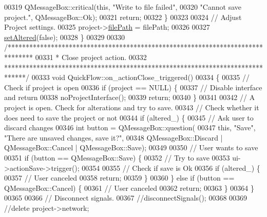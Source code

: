 \begin{DoxyCode}
00319     QMessageBox::critical(\textcolor{keyword}{this}, \textcolor{stringliteral}{"Write to file failed"},
00320                           \textcolor{stringliteral}{"Cannot save project."}, QMessageBox::Ok);
00321     \textcolor{keywordflow}{return};
00322   \}
00323 
00324   \textcolor{comment}{// Adjust Project settings.}
00325   project->\hyperlink{class_project_a79f30adcefd0b72bd4ac7db724bc9531}{filePath} = filePath;
00326 
00327   \hyperlink{group___window_ga4b63ea5ca52a9eea14db0a22b5a133f8}{setAltered}(\textcolor{keyword}{false});
00328 \}
00329 
00330 \textcolor{comment}{/*******************************************************************************}
00331 \textcolor{comment}{* Close project action.}
00332 \textcolor{comment}{******************************************************************************/}
00333 \textcolor{keywordtype}{void} QuickFlow::on\_actionClose\_triggered()
00334 \{
00335   \textcolor{comment}{// Check if project is open}
00336   \textcolor{keywordflow}{if} (project == NULL) \{
00337     \textcolor{comment}{// Disable interface and return}
00338     noProjectInterface();
00339     \textcolor{keywordflow}{return};
00340   \}
00341 
00342   \textcolor{comment}{// A project is open. Check for alterations and try to save.}
00343   \textcolor{comment}{// Check whether it does need to save the project or not}
00344   \textcolor{keywordflow}{if} (altered\_) \{
00345     \textcolor{comment}{// Ask user to discard changes}
00346     \textcolor{keywordtype}{int} button = QMessageBox::question(
00347                    \textcolor{keyword}{this}, \textcolor{stringliteral}{"Save"}, \textcolor{stringliteral}{"There are unsaved changes, save it?"},
00348                    QMessageBox::Discard | QMessageBox::Cancel | QMessageBox::Save);
00349 
00350     \textcolor{comment}{// User wants to save}
00351     \textcolor{keywordflow}{if} (button == QMessageBox::Save) \{
00352       \textcolor{comment}{// Try to save}
00353       ui->actionSave->trigger();
00354 
00355       \textcolor{comment}{// Check if save is Ok}
00356       \textcolor{keywordflow}{if} (altered\_) \{
00357         \textcolor{comment}{// User canceled}
00358         \textcolor{keywordflow}{return};
00359       \}
00360     \} \textcolor{keywordflow}{else} \textcolor{keywordflow}{if} (button == QMessageBox::Cancel) \{
00361       \textcolor{comment}{// User canceled}
00362       \textcolor{keywordflow}{return};
00363     \}
00364   \}
00365 
00366   \textcolor{comment}{// Disconnect signals.}
00367   \textcolor{comment}{//disconnectSignals();}
00368 
00369   \textcolor{comment}{//delete project->network;}

\end{DoxyCode}
